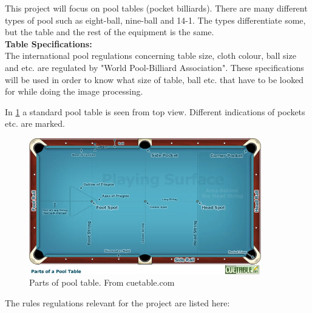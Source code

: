 This project will focus on pool tables (pocket billiards). There are many different types of pool such as eight-ball, nine-ball and 14-1. The types differentiate some, but the table and the rest of the equipment is the same.\\

\textbf{Table Specifications:}\\
The international pool regulations concerning table size, cloth colour, ball size and etc. are regulated by "World Pool-Billiard Association"\cite{poolregulations}. These specifications will be used in order to know what size of table, ball etc. that have to be looked for while doing the image processing.

In \ref{fig:partspool} a standard pool table is seen from top view. Different indications of pockets etc. are marked.

\begin{figure}[H]
\begin{center}
\leavevmode
\includegraphics[width=0.9\textwidth]{images/pooltablespecs.jpg}
\end{center}
\caption{Parts of pool table. From cuetable.com}
\label{fig:partspool}
\end{figure}

The rules regulations relevant for the project are listed here:

